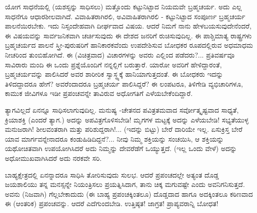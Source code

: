 ಯೋಗ ಸಾಧನೆಯಲ್ಲಿ (ಯಶಸ್ಸನ್ನು ಸಾಧಿಸಲು) ಮತ್ತೊಂದು ಕಟ್ಟುನಿಟ್ಟಾದ ನಿಯಮವೇ ಬ್ರಹ್ಮಚರ್ಯ. ಅದು ಎಲ್ಲ ಸಾಧನೆಗೂ ಆಧಾರಶೀಲವಾಗಿದೆ. ವಿವಾಹಿತರಾಗಿರಲಿ, ಅವಿವಾಹಿತರಾಗಿರಲಿ - ಕಟ್ಟುನಿಟ್ಟಾದ ಸಂಪೂರ್ಣ ಬ್ರಹ್ಮಚರ್ಯ ಪಾಲನೆಯಿರಬೇಕು. ಇದು ನಿಸ್ಸಂದೇಹವಾಗಿ ದೀರ್ಘವಾದ ವಿಷಯ. ಆದರೆ ನಿಮಗೆ ನಾನು ಹೇಳಬಯಸುವುದೇನೆಂದರೆ, ಈ ವಿಷಯವನ್ನು ಸಾರ್ವಜನಿಕವಾಗಿ ಚರ್ಚಿಸುವುದು ಈ ದೇಶದ ಜನರಿಗೆ ರುಚಿಸುವುದಿಲ್ಲ. ಈ ಪಾಶ್ಚಿಮಾತ್ಯ ರಾಷ್ಟ್ರಗಳು ಬ್ರಹ್ಮಚರ್ಯದ ಪಾಲನೆ ಸ್ತ್ರೀ-ಪುರುಷರಿಗೆ ಹಾನಿಕಾರಕವೆಂದು ಉಪದೇಶಿಸುವ ಬೋಧಕರ ರೂಪದಲ್ಲಿರುವ ಅಧಮಾಧಮ ನೀಚರಿಂದ ತುಂಬಿಹೋಗಿದೆ. ಈ (ವಿಚಿತ್ರವಾದ) ವಿಚಾರಗಳನ್ನು ಅವರು ಎಲ್ಲಿಂದ ಪಡೆದರು?... ಪ್ರತಿವರ್ಷವೂ ಸಾವಿರಾರು ಮಂದಿ ಈ ಒಂದು ಪ್ರಶ್ನೆಯೊಂದಿಗೆ ನನ್ನಲ್ಲಿಗೆ ಬರುತ್ತಾರೆ. ಯಾರೋ ಅವರಿಗೆ ಹೇಳಿದ್ದಾರಂತೆ, ಬ್ರಹ್ಮಚರ್ಯವನ್ನು ಪಾಲಿಸಿದರೆ ಅವರ ಶಾರೀರಿಕ ಸ್ವಾಸ್ಥ್ಯಕ್ಕೆ ಹಾನಿಯಾಗುತ್ತದಂತೆ. ಈ ಬೋಧಕರು ಇದನ್ನು ತಿಳಿದದ್ದಾದರೂ ಹೇಗೆ? ಅವರೆಂದಾದರೂ ಬ್ರಹ್ಮಚರ್ಯ ಪಾಲಿಸಿದ್ದರೆ? ಈ ಲಂಪಟರೂ, ತಿಳಿಗೇಡಿ ವ್ಯಭಿಚಾರಿಗಳೂ, ಕಾಮುಕ ಜೀವಿಗಳೂ ಇಡೀ ಪ್ರಪಂಚವನ್ನೇ ತಾವಿರುವ ಅಧೋಗತಿಗೆ ಎಳೆಯಬೇಕೆಂದಿದ್ದಾರೆ.

ತ್ಯಾಗವಿಲ್ಲದೆ ಏನನ್ನೂ ಸಾಧಿಸಲಾಗುವುದಿಲ್ಲ. ಮನುಷ್ಯ -ಚೇತನದ ಪವಿತ್ರತಮವಾದ ಸರ್ವೋತ್ಕೃಷ್ಟವಾದ ಸಾಧ್ಯತೆ, ಕ್ರಿಯಾಶಕ್ತಿ (ಎಂದರೆ ತ್ಯಾಗ.) ಅದನ್ನು ಅಪವಿತ್ರಗೊಳಿಸಬೇಡಿ! ಮೃಗಗಳ ಮಟ್ಟಕ್ಕೆ ಅದನ್ನು ಎಳೆಯಬೇಡಿ! ಸಭ್ಯತೆಯುಳ್ಳ ಮನುಜರಾಗಿ! ಶೀಲವಂತರಾಗಿ ಮತ್ತು ಪರಿಶುದ್ದರಾಗಿ!... (ಇದನ್ನು ಬಿಟ್ಟು) ಬೇರೆ ದಾರಿಯೇ ಇಲ್ಲ. ಏಸುಕ್ರಿಸ್ತ ಬೇರೆ ಯಾವ ಮಾರ್ಗವನ್ನೇನಾದರೂ ಕಂಡುಹಿಡಿದಿದ್ದನೆ?... ನೀವು ನಿಮ್ಮ ಶಕ್ತಿಯನ್ನು ಸಂಚಯಿಸಿ, ಆ ಶಕ್ತಿಯನ್ನು ಯಥೋಚಿತವಾಗಿ ಉಪಯೋಗಿಸಿದರೆ ಅದು ನಿಮ್ಮನ್ನು ದೇವರೆಡೆಗೆ ಒಯ್ಯುತ್ತದೆ. (ಇಲ್ಲ ಒಂದು ವೇಳೆ) ಅದನ್ನು ಅಧೋಮುಖವಾಗಿಸಿದರೆ ಅದು ನರಕವೇ ಸರಿ.

ಬಾಹ್ಯಕ್ಷೇತ್ರದಲ್ಲಿ ಏನನ್ನಾದರೂ ಸಾಧಿಸಿ ತೋರಿಸುವುದು ಸುಲಭ. ಆದರೆ ಪ್ರಪಂಚದಲ್ಲೇ ಅತ್ಯಂತ ದೊಡ್ಡ ಜಯಶಾಲಿಯು ತನ್ನ ಮನಸ್ಸನ್ನೇ ನಿಯಂತ್ರಿಸಲು ಪ್ರಯತ್ನಿಸಿದಾಗ, ತಾನು ಚಿಕ್ಕ ಮಗುವಷ್ಟೇ ಎಂದು ಅವನಿಗನಿಸುತ್ತದೆ. ಅವನು (ನಿಜವಾಗಿ) ಗೆಲ್ಲಬೇಕಾದುದು (ಈ ಬಾಹ್ಯ ಪ್ರಪಂಚಕ್ಕಿಂತಲೂ) ದೊಡ್ಡದಾದ ಹಾಗೂ ಅದಕ್ಕಿಂತಲೂ ಕಠಿಣವಾದ ಈ (ಆಂತರಿಕ) ಪ್ರಪಂಚವನ್ನು. ಆದರೆ ಎದೆಗುಂದಬೇಡಿ. ಉತ್ತಿಷ್ಠತ! ಜಾಗ್ರತ! ಪ್ರಾಪ್ಯವರಾನ್ನಿ ಬೋಧತ!

